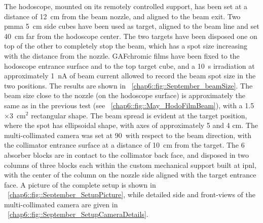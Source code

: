 The hodoscope, mounted on its remotely controlled support, has been set at a distance of 12~cm from the beam nozzle, and aligned to the beam exit. Two \gls{pmma} 5~cm side cubes have been used as target, aligned to the beam line and set 40~cm far from the hodoscope center. The two targets have been disposed one on top of the other to completely stop the beam, which has a spot size increasing with the distance from the nozzle. GAFchromic films have been fixed to the hodoscope entrance surface and to the top target cube, and a 10~s irradiation at approximately 1~nA of beam current allowed to record the beam spot size in the two positions. The results are shown in \figurename~\ref{chap6::fig::September_beamSize}. The beam size close to the nozzle (on the hodoscope surface) is approximately the same as in the previous test (see \figurename~\ref{chap6::fig::May_HodoFilmBeam}), with a 1.5$\times$3~cm$^2$ rectangular shape. The beam spread is evident at the target position, where the spot has ellipsoidal shape, with axes of approximately 5 and 4 cm. The multi-collimated camera was set at 90\textdegree ~with respect to the beam direction, with the collimator entrance surface at a distance of 10~cm from the target. The 6 absorber blocks are in contact to the collimator back face, and disposed in two columns of three blocks each within the custom mechanical support built at \gls{ipnl}, with the center of the column on the nozzle side aligned with the target entrance face. A picture of the complete setup is shown in \figurename~\ref{chap6::fig::September_SetupPicture}, while detailed side and front-views of the multi-collimated camera are given in \figurename~\ref{chap6::fig::September_SetupCameraDetails}.

